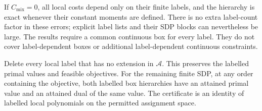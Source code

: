 If $C_{\mathrm{mix}}=0$, all local costs depend only on their finite labels,
and the hierarchy is exact whenever their constant moments are defined.
There is no extra label-count factor in these errors; explicit label lists
and their SDP blocks can nevertheless be large. The results require a
common continuous box for every label. They do not cover label-dependent
boxes or additional label-dependent continuous constraints.

\begin{proposition}\label{prop:finite-dual}
Delete every local label that has no extension in $\mathcal A$. This
preserves the labelled primal values and feasible objectives. For the
remaining finite SDP, at any order containing the objective, both labelled
box hierarchies have an attained primal value and an attained dual of the
same value. The certificate is an identity of labelled local polynomials
on the permitted assignment space.
\end{proposition}
